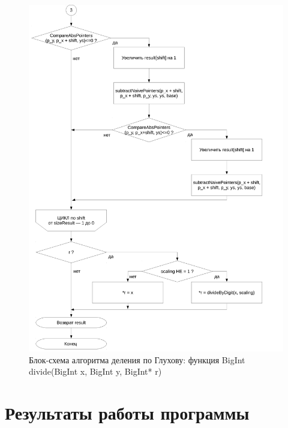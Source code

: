\documentclass[a4paper,12pt]{article} %
\begin{document}
\begin{figure}[ht]
	\includegraphics[width=\textwidth]{lr3_divide-3.pdf}
	\caption{Блок-схема алгоритма деления по Глухову: функция BigInt divide(BigInt x, BigInt y, BigInt* r)}
\end{figure}


\clearpage

\section*{Результаты работы программы}
\end{document}
